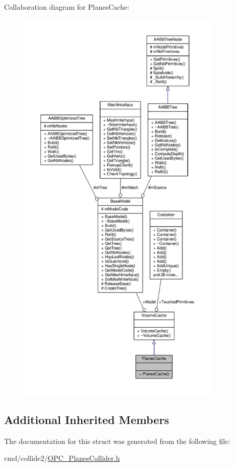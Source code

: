 Collaboration diagram for Planes\+Cache\+:
\nopagebreak
\begin{figure}[H]
\begin{center}
\leavevmode
\includegraphics[height=550pt]{d0/d1a/structPlanesCache__coll__graph}
\end{center}
\end{figure}
\subsection*{Additional Inherited Members}


The documentation for this struct was generated from the following file\+:\begin{DoxyCompactItemize}
\item 
cmd/collide2/\hyperlink{OPC__PlanesCollider_8h}{O\+P\+C\+\_\+\+Planes\+Collider.\+h}\end{DoxyCompactItemize}
